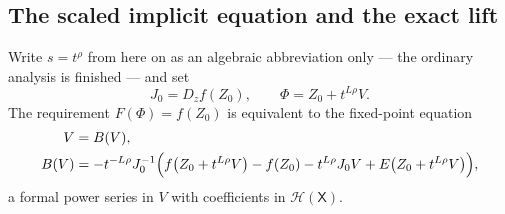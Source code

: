 \documentclass[11pt,letterpaper]{article}
\theoremstyle{definition}
\theoremstyle{remark}
\newcommand{\HH}{\mathcal H}\newcommand{\A}{\mathscr A}\newcommand{\OO}{\mathcal O}
\numberwithin{equation}{section}
\begin{document}
\subsection{The scaled implicit equation and the exact lift}
\label{contours:subsec:exactlift}
Write $s=t^\rho$ from here on as an algebraic abbreviation only --- the ordinary
analysis is finished --- and set
\[
  J_0=D_zf(Z_0),\qquad \Phi=Z_0+t^{L\rho}V .
\]
The requirement $F(\Phi)=f(Z_0)$ is equivalent to the fixed-point equation
\begin{align}
  V&=B(V),\label{contours:eq:Bequation}\\
  B(V)&=-t^{-L\rho}J_0^{-1}\Bigl(
    f\bigl(Z_0+t^{L\rho}V\bigr)-f(Z_0)-t^{L\rho}J_0V
    +E\bigl(Z_0+t^{L\rho}V\bigr)\Bigr),
  \label{contours:eq:Bdefinition}
\end{align}
a formal power series in $V$ with coefficients in $\HH(\mathsf X)$.
\end{document}
